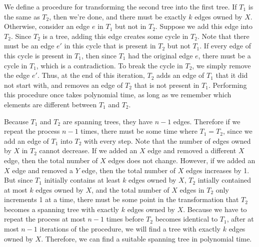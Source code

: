 \documentclass[oneside, 12pt]{article}
\begin{document}
\begin{enumerate}
We define a procedure for transforming the second tree into the first tree. If $T_1$ is the same as $T_2$, then we're done, and there must be exactly $k$ edges owned by $X$. Otherwise, consider an edge $e$ in $T_1$ but not in $T_2$. Suppose we add this edge into $T_2$. Since $T_2$ is a tree, adding this edge creates some cycle in $T_2$. Note that there must be an edge $e'$ in this cycle that is present in $T_2$ but not $T_1$. If every edge of this cycle is present in $T_1$, then since $T_1$ had the original edge $e$, there must be a cycle in $T_1$, which is a contradiction. To break the cycle in $T_2$, we simply remove the edge $e'$. Thus, at the end of this iteration, $T_2$ adds an edge of $T_1$ that it did not start with, and removes an edge of $T_2$ that is not present in $T_1$. Performing this procedure once takes polynomial time, as long as we remember which elements are different between $T_1$ and $T_2$. 

Because $T_1$ and $T_2$ are spanning trees, they have $n-1$ edges. Therefore if we repeat the process $n - 1$ times, there must be some time where $T_1 = T_2$, since we add an edge of $T_1$ into $T_2$ with every step. Note that the number of edges owned by $X$ in $T_2$ cannot decrease. If we added an $X$ edge and removed a different $X$ edge, then the total number of $X$ edges does not change. However, if we added an $X$ edge and removed a $Y$ edge, then the total number of $X$ edges increases by 1. But since $T_1$ initially contains at least $k$ edges owned by $X$, $T_2$ intially contained at most $k$ edges owned by $X$, and the total number of $X$ edges in $T_2$ only increments 1 at a time, there must be some point in the transformation that $T_2$ becomes a spanning tree with exactly $k$ edges owned by $X$. Because we have to repeat the process at most $n-1$ times before $T_2$ becomes identical to $T_1$, after at most $n-1$ iterations of the procedure, we will find a tree with exactly $k$ edges owned by $X$. Therefore, we can find a suitable spanning tree in polynomial time. 
\setcounter{enumi}{3}
\clearpage

\end{enumerate}
\end{document}
